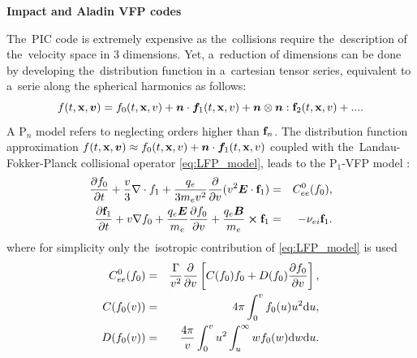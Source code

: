 \textbf{Impact and Aladin VFP codes}

The~PIC code is extremely expensive as the~collisions require the~description 
of the~velocity space in 3 dimensions. Yet, a~reduction of dimensions can be 
done by developing the~distribution function in a~cartesian tensor series, 
equivalent to a~serie along the spherical harmonics \cite{Johnston_PR1960}
as follows:
\begin{equation}
  f(t,\mathbf{x},\boldsymbol{v}) = f_0(t,\mathbf{x},v) 
  + \boldsymbol{n}\cdot \boldsymbol{f}_1(t,\mathbf{x},v)
  +\boldsymbol{n}\otimes\boldsymbol{n}:\mathbf{f}_2(t,\mathbf{x},v)+... .
  \label{Pn}
\end{equation}
A P$_n$ model refers to 
neglecting orders higher than $\mathbf{f}_n$. The distribution function 
approximation $f(t,\mathbf{x},\boldsymbol{v})\approx f_0(t,\mathbf{x},v)
+\boldsymbol{n}\cdot \boldsymbol{f}_1(t,\mathbf{x},v)$ coupled with 
the~Landau-Fokker-Planck collisional operator 
\eqref{eq:LFP_model}, leads to the P$_1$-VFP model 
\cite{Johnston_PR1960, Kingham_JCP2004}:
\begin{eqnarray}
\frac{\partial f_0}{\partial t}+\frac{v}{3}\nabla \cdot f_1
+\frac{q_e}{3m_ev^2}\frac{\partial}{\partial v}(v^2\boldsymbol{E}\cdot \mathbf{f}_1)
&=&
C^0_{ee}(f_0) ,
 \label{eq:P1f0_Aladin}\\
\frac{\partial \mathbf{f}_1}{\partial t}+v\nabla f_0
+ \frac{q_e\boldsymbol{E}}{m_e}\frac{\partial f_0}{\partial v}
+\frac{q_e\boldsymbol{B}}{m_e}\boldsymbol{\times} \mathbf{f}_1 
&=&
- \nu_{ei}\mathbf{f}_1 .
\label{eq:P1f1_Aladin}
\end{eqnarray}
where for simplicity only the~isotropic 
contribution of \eqref{eq:LFP_model} is used 
\begin{eqnarray} 
C^0_{ee}(f_0) &=& \frac{\Gamma}{v^2}\frac{\partial}{\partial v}
\left[C(f_0)f_0+D(f_0)\frac{\partial f_0}{\partial v}\right] ,
\\
C(f_0(v)) &=& 4\pi\int_0^v f_0(u) u^2 \text{d} u ,
\\
D(f_0(v)) &=& \frac{4\pi}{v}\int_0^v u^2\int_u^\infty w f_0(w) 
\text{d} w \text{d} u .
\end{eqnarray}

 %

